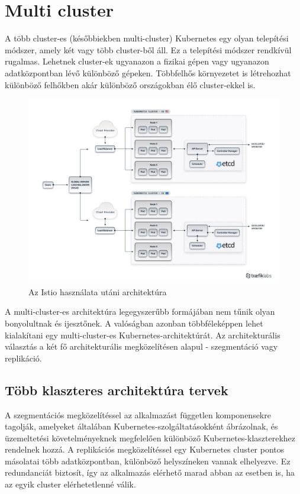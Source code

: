 \section{Multi cluster}
A több cluster-es (későbbiekben multi-cluster) Kubernetes egy olyan telepítési módszer, amely két vagy több cluster-ből áll. Ez a telepítési módszer rendkívül rugalmas. Lehetnek cluster-ek ugyanazon a fizikai gépen vagy ugyanazon adatközpontban lévő különböző gépeken. Többfelhős környezetet is létrehozhat különböző felhőkben akár különböző országokban élő cluster-ekkel is.

\begin{figure}[ht]
    \centering
         \includegraphics[width=1.0\textwidth]{figures/istio/multicluster.png}
          \caption{Az Istio használata utáni architektúra \cite{multicluster}}
           \label{multi-cluster}
\end{figure}

A multi-cluster-es architektúra legegyszerűbb formájában nem tűnik olyan bonyolultnak és ijesztőnek. A valóságban azonban többféleképpen lehet kialakítani egy multi-cluster-es Kubernetes-architektúrát. Az architekturális választás a két fő architekturális megközelítésen alapul - szegmentáció vagy replikáció.
\cite{multicluster}

\subsection{Több klaszteres architektúra tervek}
A szegmentációs megközelítéssel az alkalmazást független komponensekre tagolják, amelyeket általában Kubernetes-szolgáltatásokként ábrázolnak, és üzemeltetési követelményeknek megfelelően különböző Kubernetes-klaszterekhez rendelnek hozzá. A replikációs megközelítéssel egy Kubernetes cluster pontos másolatai több adatközpontban, különböző helyszíneken vannak elhelyezve. Ez redundanciát biztosít, így az alkalmazás elérhető marad abban az esetben is, ha az egyik cluster elérhetetlenné válik.
\cite{multicluster}

